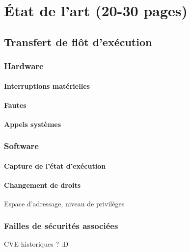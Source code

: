\chapter{État de l'art (20-30 pages)}

	
	\section{Transfert de flôt d'exécution}

		\subsection{Hardware}

			\subsubsection{Interruptions matérielles}

			\subsubsection{Fautes}

			\subsubsection{Appels systèmes}

		\subsection{Software}

			\subsubsection{Capture de l'état d'exécution}

			\subsubsection{Changement de droits}

				Espace d'adressage, niveau de privilèges

		\subsection{Failles de sécurités associées}
			CVE historiques ? :D

